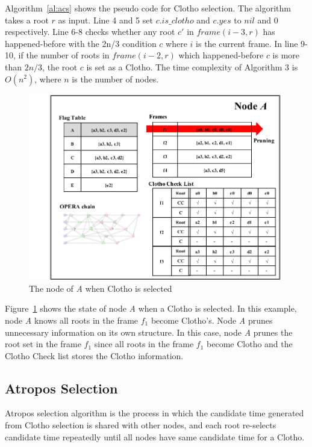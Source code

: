 \documentclass{article}
\begin{document}
Algorithm~\ref{al:acs} shows the pseudo code for Clotho selection. The algorithm takes a root $r$ as input. 
Line 4 and 5 set $c.is\_clotho$ and $c.yes$ to $nil$ and 0 respectively. Line 6-8 checks whether any root $c'$ in $frame(i-3,r)$ has happened-before with the 2n/3 condition $c$ where $i$ is the current frame. In line 9-10, if the number of roots in $frame(i-2,r)$ which happened-before $c$ is more than $2n/3$, the root $c$ is set as a Clotho. The time complexity of Algorithm 3 is $O(n^{2})$, where $n$ is the number of nodes. 

\begin{figure}[h] \centering  
	\includegraphics[width=1.0\columnwidth]{Clotho_fig2.pdf}
	\caption{The node of \textit{A} when Clotho is selected}
	\label{fig:ClothoNodeA}	
\end{figure}

\newpage
Figure~\ref{fig:ClothoNodeA} shows the state of node \textit{A} when a Clotho is selected. In this example, node \textit{A} knows all roots in the frame $f_1$ become Clotho's. Node \textit{A} prunes unnecessary information on its own structure. In this case, node \textit{A} prunes the root set in the frame $f_1$ since all roots in the frame $f_1$ become Clotho and the Clotho Check list stores the Clotho information. 

\subsection{Atropos Selection}

Atropos selection algorithm is the process in which the candidate time generated from Clotho selection is shared with other nodes, and each root re-selects candidate time repeatedly until all nodes have same candidate time for a Clotho. 
\end{document}

